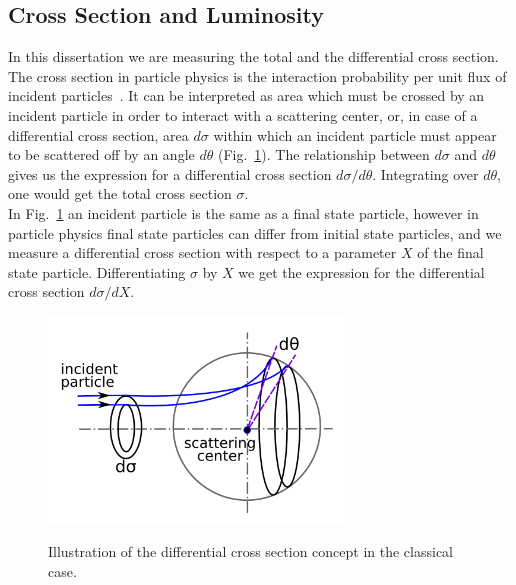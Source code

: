 \subsection{Cross Section and Luminosity}
\label{sec:LumiAndCS}

In this dissertation we are measuring the total and the differential cross section. The cross section in particle physics is the interaction probability per unit flux of incident particles~\cite{ref_fnal_LumiCS}. It can be interpreted as area which must be crossed by an incident particle in order to interact with a scattering center, or, in case of a differential cross section, area $d\sigma$ within which an incident particle must appear to be scattered off by an angle $d\theta$ (Fig.~\ref{fig:CSclassical}). The relationship between $d\sigma$ and $d\theta$ gives us the expression for a differential cross section $d\sigma/d\theta$. Integrating over $d\theta$, one would get the total cross section $\sigma$. \\

In Fig.~\ref{fig:CSclassical} an incident particle is the same as a final state particle, however in particle physics final state particles can differ from initial state particles, and we measure a differential cross section with respect to a parameter $X$ of the final state particle. Differentiating $\sigma$ by $X$ we get the expression for the differential cross section $d\sigma/dX$.\\

\begin{figure}[htb]
  \begin{center}
    {\includegraphics[width=0.70\textwidth]{../figs/WgAbout/CSclassical.png}}
    \caption{Illustration of the differential cross section concept in the classical case.}
    \label{fig:CSclassical}
  \end{center}
\end{figure}

